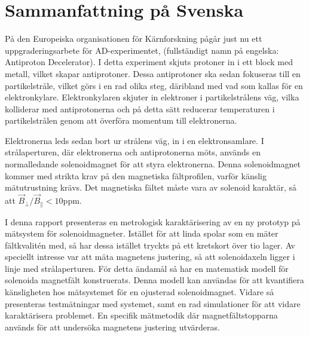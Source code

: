 \documentclass{UUThesisTemplate}
\begin{document}
\frontmatter

\newlength{\originalVOffset}
\newlength{\originalHOffset}
\setlength{\originalVOffset}{\voffset}   
\setlength{\originalHOffset}{\hoffset}

\setlength{\voffset}{0cm}
\setlength{\hoffset}{0cm}


\setlength{\voffset}{\originalVOffset}
\setlength{\hoffset}{\originalHOffset}

\newpage
\section*{Sammanfattning på Svenska}
På den Europeiska organisationen för Kärnforskning pågår just
nu ett uppgraderingsarbete för AD-experimentet, (fullständigt
namn på engelska: Antiproton Decelerator). I detta experiment
skjuts protoner in i ett block med metall, vilket skapar 
antiprotoner. Dessa antiprotoner ska sedan fokuseras till
en partikelstråle, vilket görs i en rad olika steg, däribland
med vad som kallas för en elektronkylare. Elektronkylaren
skjuter in elektroner i partikelstrålens väg, vilka kolliderar
med antiprotonerna och på detta sätt reducerar temperaturen
i partikelstrålen genom att överföra momentum till elektronerna.

Elektronerna leds sedan bort ur strålens väg, in i en elektronsamlare.
I strålaperturen, där elektronerna och antiprotonerna möts, används
en normalledande solenoidmagnet för att styra elektronerna. Denna
solenoidmagnet kommer med strikta krav på den magnetiska fältprofilen,
varför känslig mätutrustning krävs. Det magnetiska fältet måste
vara av solenoid karaktär, så att $\vec{B}_\perp / \vec{B}_\parallel < 10$ppm.

I denna rapport presenteras en metrologisk karaktärisering av en
ny prototyp på mätsystem för solenoidmagneter. Istället för att linda spolar som en mäter
fältkvalitén med, så har dessa istället tryckts på ett kretskort över
tio lager. Av speciellt intresse var att mäta magnetens justering, så
att solenoidaxeln ligger i linje med strålaperturen. För detta ändamål
så har en matematisk modell för solenoida magnetfält konstruerats. Denna
modell kan användas för att kvantifiera känsligheten hos mätsystemet
för en ojusterad solenoidmagnet. Vidare så presenteras testmätningar
med systemet, samt en rad simulationer för att vidare karaktärisera problemet.
En specifik mätmetodik där magnetfältstopparna används för att undersöka 
magnetens justering utvärderas.
\end{document}
